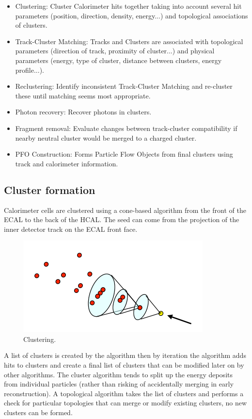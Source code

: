 \documentclass[a4paper,12pt]{article}
\begin{document}
\noindent
\begin{itemize}
\item Clustering: Cluster Calorimeter hits together taking into account several hit parameters (position, direction, density, energy...) and topological associations of clusters.
\item Track-Cluster Matching: Tracks and Clusters are associated with topological parameters (direction of track, proximity of cluster...) and physical parameters (energy, type of cluster, distance between clusters, energy profile...).
\item Reclustering: Identify inconsistent Track-Cluster Matching and re-cluster these until matching seems most appropriate.
\item Photon recovery: Recover photons in clusters.
\item Fragment removal: Evaluate changes between track-cluster compatibility if nearby neutral cluster would be merged to a charged cluster.
\item PFO Construction: Forms Particle Flow Objects from final clusters using track and calorimeter information.
\end{itemize}

\subsection{Cluster formation}

Calorimeter cells are clustered using a cone-based algorithm from the front of the ECAL to the back of the HCAL. The seed can come from the projection of the inner detector track on the ECAL front face. 

\begin{figure}[!h]
   \centering
   \includegraphics[scale=0.5]{clustering_cone.png} 
      \caption{Clustering.}
   \label{fig:clustering}
\end{figure}

A list of clusters is created by the algorithm then by iteration the algorithm adds hits to clusters and create a final list of clusters that can be modified later on by other algorithms. The cluster algorithm tends to split up the energy deposits from individual particles (rather than risking of accidentally merging in early reconstruction).
A topological algorithm takes the list of clusters and performs a check for particular topologies that can merge or modify existing clusters, no new clusters can be formed. 
\end{document}
